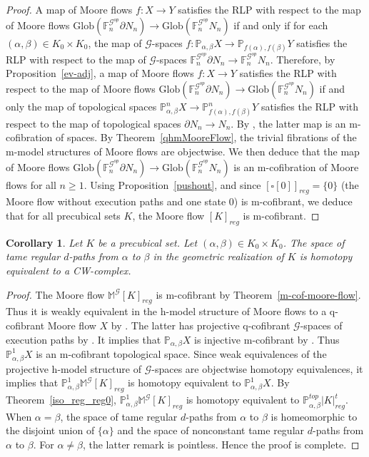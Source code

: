 \documentclass[a4paper,12pt]{amsart}
\newcommand{\de}{\partial}
\newcommand{\p}{\times}
\renewcommand{\P}{\mathbb{P}}
\newtheorem{cor}[thm]{Corollary}
\newcommand{\bpf}{\begin{proof}}
\newcommand{\epf}{\end{proof}}
\theoremstyle{definition}
\renewcommand{\geq}{\geqslant}
\newcommand{\moore}{{\mathbb{M}}}
\newcommand{\glob}{{\mathrm{Glob}}}
\renewcommand{\P}{\mathbb{P}}
\begin{document}
\bpf A map of Moore flows $f:X\to Y$ satisfies the RLP with respect to the map of Moore flows $\glob(\mathbb{F}^{\mathcal{G}^{op}}_n\de N_n) \to \glob(\mathbb{F}^{\mathcal{G}^{op}}_n N_n)$ if and only if for each $(\alpha,\beta)\in K_0\p K_0$, the map of $\mathcal{G}$-spaces $f:\P_{\alpha,\beta}X \to \P_{f(\alpha),f(\beta)}Y$ satisfies the RLP with respect to the map of $\mathcal{G}$-spaces $\mathbb{F}_n^{\mathcal{G}^{op}}\de N_n \to \mathbb{F}_n^{\mathcal{G}^{op}} N_n$. Therefore, by Proposition~\ref{ev-adj}, a map of Moore flows $f:X\to Y$ satisfies the RLP with respect to the map of Moore flows $\glob(\mathbb{F}^{\mathcal{G}^{op}}_n\de N_n) \to \glob(\mathbb{F}^{\mathcal{G}^{op}}_n N_n)$ if and only the map of topological spaces $\P^n_{\alpha,\beta}X \to \P^n_{f(\alpha),f(\beta)}Y$ satisfies the RLP with respect to the map of topological spaces $\de N_n \to N_n$. By \cite[Theorem~5.9]{NaturalRealization}, the latter map is an m-cofibration of spaces. By Theorem~\ref{qhmMooreFlow}, the trivial fibrations of the m-model structures of Moore flows are objectwise. We then deduce that the map of Moore flows $\glob(\mathbb{F}^{\mathcal{G}^{op}}_n\de N_n) \to \glob(\mathbb{F}^{\mathcal{G}^{op}}_n N_n)$ is an m-cofibration of Moore flows for all $n\geq 1$. Using Proposition~\ref{pushout}, and since $[\square[0]]_{reg} = \{0\}$ (the Moore flow without execution paths and one state $0$) is m-cofibrant, we deduce that for all precubical sets $K$, the Moore flow $[K]_{reg}$ is m-cofibrant.  
\epf


\begin{cor} \label{space-mcof}
	Let $K$ be a precubical set. Let $(\alpha,\beta)\in K_0\p K_0$. The space of tame regular $d$-paths from $\alpha$ to $\beta$ in the geometric realization of $K$ is homotopy equivalent to a CW-complex.
\end{cor}


\bpf
The Moore flow $\moore^{\mathcal{G}}[K]_{reg}$ is m-cofibrant by Theorem~\ref{m-cof-moore-flow}. Thus it is weakly equivalent in the h-model structure of Moore flows to a q-cofibrant Moore flow $X$ by \cite[Corollary~3.7]{mixed-cole}. The latter has projective q-cofibrant $\mathcal{G}$-spaces of execution paths by \cite[Theorem~9.11]{Moore1}. It implies that $\P_{\alpha,\beta}X$ is injective m-cofibrant by \cite[Corollary~7.2]{dgrtop}. Thus $\P^1_{\alpha,\beta}X$ is an m-cofibrant topological space. Since weak equivalences of the projective h-model structure of $\mathcal{G}$-spaces are objectwise homotopy equivalences, it implies that $\P^1_{\alpha,\beta}\moore^{\mathcal{G}}[K]_{reg}$ is homotopy equivalent to $\P^1_{\alpha,\beta}X$. By Theorem~\ref{iso_reg_reg0}, $\P^1_{\alpha,\beta}\moore^{\mathcal{G}}[K]_{reg}$ is homotopy equivalent to $\P^{top}_{\alpha,\beta}|K|^t_{reg}$. When $\alpha=\beta$, the space of tame regular $d$-paths from $\alpha$ to $\beta$ is homeomorphic to the disjoint union of $\{\alpha\}$ and the space of nonconstant tame regular $d$-paths from $\alpha$ to $\beta$. For $\alpha\neq \beta$, the latter remark is pointless. Hence the proof is complete. 
\epf
\end{document}
